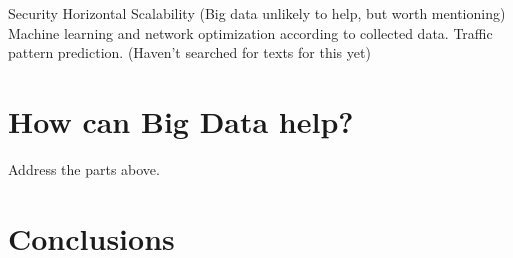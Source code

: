 \documentclass{acm_proc_article-sp}
\begin{document}
Security \cite{Kreutz13}
Horizontal Scalability (Big data unlikely to help, but worth mentioning)
Machine learning and network optimization according to collected data. Traffic pattern prediction. (Haven't searched for texts for this yet)

\section{How can Big Data help?}

Address the parts above.

\section{Conclusions}



\end{document}
